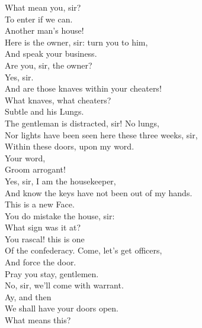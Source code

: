\documentclass[a4paper,oneside,12pt]{memoir}
\begin{document}
\begin{drama*}
\facespeaks {} What mean you, sir?\\
\mammonspeaks To enter if we can.\\
\facespeaks {} Another man's house!\\
Here is the owner, sir: turn you to him,\\
And speak your business.\\
\mammonspeaks {} Are you, sir, the owner?\\
\lovewitspeaks Yes, sir.\\
\mammonspeaks {} And are those knaves within your cheaters!\\
\lovewitspeaks What knaves, what cheaters?\\
\mammonspeaks {} Subtle and his Lungs.\\
\facespeaks The gentleman is distracted, sir! No lungs,\\
Nor lights have been seen here these three weeks, sir,\\
Within these doors, upon my word.\\
\surlyspeaks {} Your word,\\
Groom arrogant!\\
\facespeaks {} Yes, sir, I am the housekeeper,\\
And know the keys have not been out of my hands.\\
\surlyspeaks This is a new Face.\\
\facespeaks {} You do mistake the house, sir:\\
What sign was it at?\\
\surlyspeaks {} You rascal! this is one\\
Of the confederacy. Come, let's get officers,\\
And force the door.\\
\lovewitspeaks {} Pray you stay, gentlemen.\\
\surlyspeaks No, sir, we'll come with warrant.\\
\mammonspeaks {} Ay, and then\\
We shall have your doors open.\\
\lovewitspeaks {} What means this?\\

\end{drama*}
\end{document}
